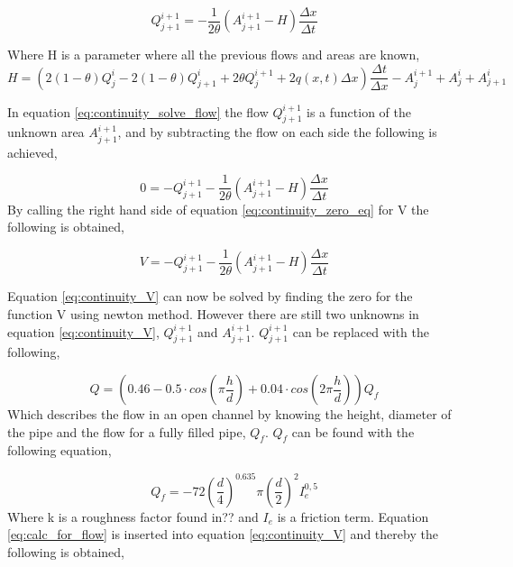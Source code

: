 \begin{equation}\label{eq:continuity_solve_flow}
	Q_{j+1}^{i+1} = - \frac{1}{2\theta}\left(A_{j+1}^{i+1}-H\right)\frac{\Delta x}{\Delta t}
\end{equation}

Where H is a parameter where all the previous flows and areas are known,
\begin{equation}
	H = \left(2(1-\theta)Q_j^i-2(1-\theta)Q_{j+1}^i+2\theta Q_j^{i+1}+2q(x,t)\Delta x\right)\frac{\Delta t}{\Delta x}- A_{j}^{i+1}+A_j^i+A_{j+1}^i
\end{equation}


In equation \ref{eq:continuity_solve_flow} the flow $Q_{j+1}^{i+1}$ is a function of the unknown area $A_{j+1}^{i+1}$, and by subtracting the flow on each side the following is achieved,

\begin{equation}\label{eq:continuity_zero_eq}
		0=-Q_{j+1}^{i+1}  - \frac{1}{2\theta}\left(A_{j+1}^{i+1}-H\right)\frac{\Delta x}{\Delta t}
\end{equation}
By calling the right hand side of equation \ref{eq:continuity_zero_eq} for V the following is obtained,

\begin{equation}\label{eq:continuity_V}
		V=-Q_{j+1}^{i+1}  - \frac{1}{2\theta}\left(A_{j+1}^{i+1}-H\right)\frac{\Delta x}{\Delta t}
\end{equation}

Equation \ref{eq:continuity_V} can now be solved by finding the zero for the function V using newton method. However there are still two unknowns in equation \ref{eq:continuity_V}, $Q_{j+1}^{i+1}$ and $A_{j+1}^{i+1}$. $Q_{j+1}^{i+1}$ can be replaced with the following,

\begin{equation}\label{eq:calc_for_flow}
 	Q = \left(0.46-0.5 \cdot cos\left(\pi \frac{h}{d}\right)+0.04\cdot cos\left(2\pi\frac{h}{d}\right)\right)Q_f
\end{equation}
Which describes the flow in an open channel by knowing the height, diameter of the pipe and the flow for a fully filled pipe, $Q_f$. $Q_f$ can be found with the following equation,

\begin{equation}\label{eq:qf_for_flow}
	Q_f =-72\left(\frac{d}{4}\right)^{0.635}\pi\left(\frac{d}{2}\right)^2I_e^{0,5}%
\end{equation}
Where k is a roughness factor found in??  and $I_e$ is a friction term. Equation \ref{eq:calc_for_flow} is inserted into equation \ref{eq:continuity_V} and thereby the following is obtained,

